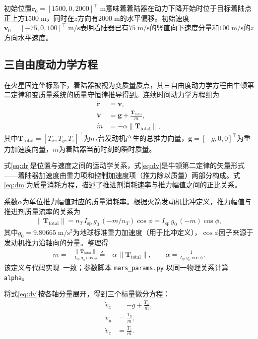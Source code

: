 初始位置$\bm{r}_0 = [1500, 0, 2000]^{\top}\;\mathrm{m}$意味着着陆器在动力下降开始时位于目标着陆点正上方$1500\;\mathrm{m}$，同时在$z$方向有$2000\;\mathrm{m}$的水平偏移。初始速度$\bm{v}_0 = [-75, 0, 100]^{\top}\;\mathrm{m/s}$表明着陆器已有$75\;\mathrm{m/s}$的竖直向下速度分量和$100\;\mathrm{m/s}$的$z$方向水平速度。

\subsection{三自由度动力学方程}

在火星固连坐标系下，着陆器被视为变质量质点，其三自由度动力学方程由牛顿第二定律和变质量系统的质量守恒律推导得到。连续时间动力学方程组为
\begin{align}
    \dot{\bm{r}} &= \bm{v}, \label{eq:dr} \\
    \dot{\bm{v}} &= \bm{g} + \frac{\bm{T}_{\mathrm{total}}}{m}, \label{eq:dv} \\
    \dot{m}      &= -\alpha \left\|\bm{T}_{\mathrm{total}}\right\|, \label{eq:dm}
\end{align}
其中$\bm{T}_{\mathrm{total}} = [T_x, T_y, T_z]^{\top}$为$n_T$台发动机产生的总推力向量，$\bm{g} = [-g, 0, 0]^{\top}$为重力加速度向量，$m$为着陆器当前时刻的瞬时质量。

式\eqref{eq:dr}是位置与速度之间的运动学关系，式\eqref{eq:dv}是牛顿第二定律的矢量形式——着陆器加速度由重力项和控制加速度项（推力除以质量）两部分构成。式\eqref{eq:dm}为质量消耗方程，描述了推进剂消耗速率与推力幅值之间的正比关系。

系数$\alpha$为单位推力幅值对应的质量消耗率。根据火箭发动机比冲定义，推力幅值与推进剂质量流率的关系为
\begin{align}
    \|\bm{T}_{\mathrm{total}}\| = n_T\,I_{\mathrm{sp}}\,g_0\,(-\dot{m}/n_T)\cos\phi
                               = I_{\mathrm{sp}}\,g_0\,(-\dot{m})\cos\phi,
\end{align}
其中$g_0 = 9.80665\;\mathrm{m/s^2}$为地球标准重力加速度（用于比冲定义），$\cos\phi$因子来源于发动机推力沿轴向的分量。整理得
\begin{align}
    \dot{m} = -\frac{\|\bm{T}_{\mathrm{total}}\|}{I_{\mathrm{sp}}\,g_0\cos\phi}
            \triangleq -\alpha\,\|\bm{T}_{\mathrm{total}}\|,
    \qquad
    \alpha = \frac{1}{I_{\mathrm{sp}}\,g_0\cos\phi}. \label{eq:alpha}
\end{align}
该定义与代码实现~\cite{blackmore2010minimum}\cite{acikmese2007lossless}一致；参数脚本 \texttt{mars\_params.py} 以同一物理关系计算 \texttt{alpha}。

将式\eqref{eq:dv}按各轴分量展开，得到三个标量微分方程：
\begin{align}
    \dot{v}_x &= -g + \frac{T_x}{m}, \label{eq:dvx} \\
    \dot{v}_y &= \frac{T_y}{m}, \label{eq:dvy} \\
    \dot{v}_z &= \frac{T_z}{m}. \label{eq:dvz}
\end{align}

